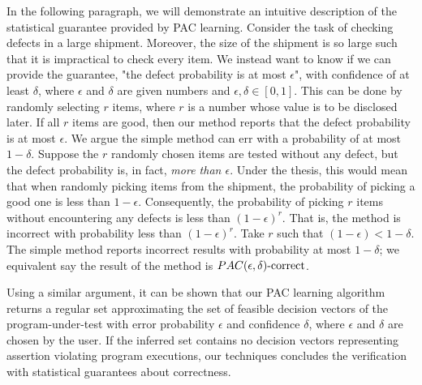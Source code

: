 In the following paragraph, we will demonstrate an intuitive description of the statistical guarantee provided by PAC learning. Consider the task of checking defects in a large shipment. Moreover, the size of the shipment is so large such that it is impractical to check every item. We instead want to know if we can provide the guarantee, "the defect probability is at most $\epsilon$", with confidence of at least $\delta$, where $\epsilon$ and $\delta$ are given numbers and $\epsilon, \delta \in [0,1]$. This can be done by randomly selecting $r$ items, where $r$ is a number whose value is to be disclosed later. If all $r$ items are good, then our method reports that the defect probability is at most $\epsilon$. We argue the simple method can err with a probability of at most $1-\delta$. Suppose the $r$ randomly chosen items are tested without any defect, but the defect probability is, in fact, \emph{more than $\epsilon$}. Under the thesis, this would mean that when randomly picking items from the shipment, the probability of picking a good one is less than $1-\epsilon$. Consequently, the probability of picking $r$ items without encountering any defects is less than $(1-\epsilon)^r$. That is, the method is incorrect with probability less than $(1-\epsilon)^r$. Take $r$ such that $(1-\epsilon) < 1-\delta$. The simple method reports incorrect results with probability at most $1-\delta$; we equivalent say the result of the method is \emph{$PAC(\epsilon, \delta)\text{-correct}$}.

Using a similar argument, it can be shown that our PAC learning algorithm returns a regular set approximating the set of feasible decision vectors of the program-under-test with error probability $\epsilon$ and confidence $\delta$, where $\epsilon$ and $\delta$ are chosen by the user. If the inferred set contains no decision vectors representing assertion violating program executions, our techniques concludes the verification with statistical guarantees about correctness. 

